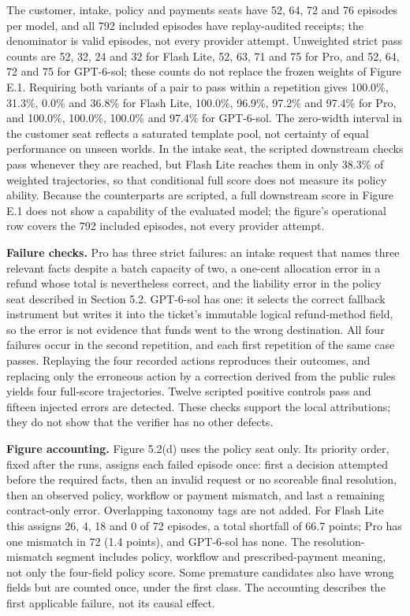 The customer, intake, policy and payments seats have 52, 64, 72 and 76 episodes per model, and all 792 included
episodes have replay-audited receipts; the denominator is valid episodes, not every provider attempt. Unweighted
strict pass counts are 52, 32, 24 and 32 for Flash Lite, 52, 63, 71 and 75 for Pro, and 52, 64, 72 and 75 for
GPT-6-sol; these counts do not replace the frozen weights of Figure E.1. Requiring both variants of a pair to pass
within a repetition gives 100.0\%, 31.3\%, 0.0\% and 36.8\% for Flash Lite, 100.0\%, 96.9\%, 97.2\% and 97.4\% for Pro, and
100.0\%, 100.0\%, 100.0\% and 97.4\% for GPT-6-sol. The zero-width interval in the customer seat reflects a saturated
template pool, not certainty of equal performance on unseen worlds. In the intake seat, the scripted downstream checks
pass whenever they are reached, but Flash Lite reaches them in only 38.3\% of weighted trajectories, so that
conditional full score does not measure its policy ability. Because the counterparts are scripted, a full downstream
score in Figure E.1 does not show a capability of the evaluated model; the figure's operational row covers the 792
included episodes, not every provider attempt.

\textbf{Failure checks.} Pro has three strict failures: an intake request that names three relevant facts despite a batch
capacity of two, a one-cent allocation error in a refund whose total is nevertheless correct, and the liability error
in the policy seat described in Section 5.2. GPT-6-sol has one: it selects the correct fallback instrument but writes
it into the ticket's immutable logical refund-method field, so the error is not evidence that funds went to the wrong
destination. All four failures occur in the second repetition, and each first repetition of the same case passes.
Replaying the four recorded actions reproduces their outcomes, and replacing only the erroneous action by a
correction derived from the public rules yields four full-score trajectories. Twelve scripted positive controls pass
and fifteen injected errors are detected. These checks support the local attributions; they do not show that the
verifier has no other defects.

\textbf{Figure accounting.} Figure 5.2(d) uses the policy seat only. Its priority order, fixed after the runs, assigns
each failed episode once: first a decision attempted before the required facts, then an invalid request or no
scoreable final resolution, then an observed policy, workflow or payment mismatch, and last a remaining contract-only
error. Overlapping taxonomy tags are not added. For Flash Lite this assigns 26, 4, 18 and 0 of 72 episodes, a total
shortfall of 66.7 points; Pro has one mismatch in 72 (1.4 points), and GPT-6-sol has none. The resolution-mismatch
segment includes policy, workflow and prescribed-payment meaning, not only the four-field policy score. Some premature
candidates also have wrong fields but are counted once, under the first class. The accounting describes the first
applicable failure, not its causal effect.

